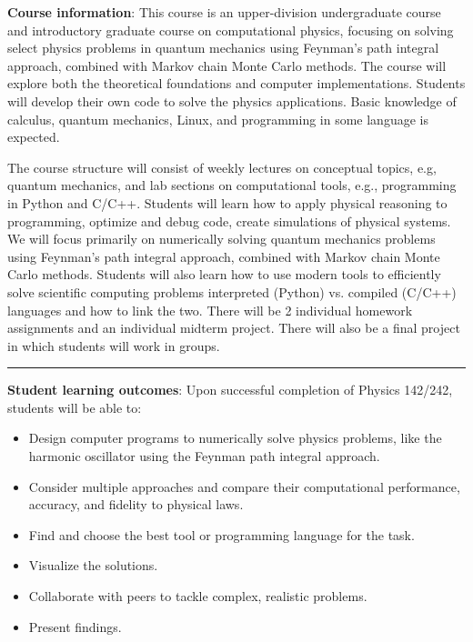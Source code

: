 \documentclass[12pt]{article}
\begin{document}
\noindent\textbf{Course information}: This course is an upper-division undergraduate course and introductory graduate course on computational physics, focusing on solving select physics problems in quantum mechanics using Feynman's path integral approach, combined with Markov chain Monte Carlo methods.
The course will explore both the theoretical foundations and computer implementations.
Students will develop their own code to solve the physics applications.
Basic knowledge of calculus, quantum mechanics, Linux, and programming in some language is expected.

The course structure will consist of weekly lectures on conceptual topics, e.g, quantum mechanics, and lab sections on computational tools, e.g., programming in Python and C/C++.
Students will learn how to apply physical reasoning to programming, optimize and debug code, create simulations of physical systems.
We will focus primarily on numerically solving quantum mechanics problems using Feynman's path integral approach, combined with Markov chain Monte Carlo methods.
Students will also learn how to use modern tools to efficiently solve scientific computing problems interpreted (Python) vs. compiled (C/C++) languages and how to link the two.
There will be 2 individual homework assignments and an individual midterm project.
There will also be a final project in which students will work in groups.

\begin{center}
  \rule{\textwidth}{0.5pt}
\end{center}

\noindent\textbf{Student learning outcomes}: Upon successful completion of Physics 142/242, students will be able to:
\begin{itemize}
  \item Design computer programs to numerically solve physics problems, like the harmonic oscillator using the Feynman path integral approach.
  \item Consider multiple approaches and compare their computational performance, accuracy, and fidelity to physical laws.
  \item Find and choose the best tool or programming language for the task.
  \item Visualize the solutions.
  \item Collaborate with peers to tackle complex, realistic problems.
  \item Present findings.
\end{itemize}
\end{document}
